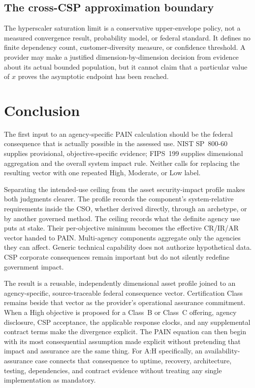 \documentclass[11pt]{article}
\begin{document}
\subsection{The cross-CSP approximation boundary}

The hyperscaler saturation limit is a conservative upper-envelope policy, not a
measured convergence result, probability model, or federal standard. It defines no
finite dependency count, customer-diversity measure, or confidence threshold. A
provider may make a justified dimension-by-dimension decision from evidence about
its actual bounded population, but it cannot claim that a particular value of $x$
proves the asymptotic endpoint has been reached.

\clearpage
\section{Conclusion}

The first input to an agency-specific PAIN calculation should be the federal
consequence that is actually possible in the assessed use. NIST SP~800-60 supplies
provisional, objective-specific evidence; FIPS~199 supplies dimensional aggregation
and the overall system impact rule. Neither calls for replacing the resulting
vector with one repeated High, Moderate, or Low label.

Separating the intended-use ceiling from the asset security-impact profile makes
both judgments clearer. The profile records the component's system-relative
requirements inside the CSO, whether derived directly, through an archetype, or by
another governed method. The ceiling records what the definite agency use puts at
stake. Their per-objective minimum becomes the effective CR/IR/AR vector handed to
PAIN. Multi-agency components aggregate only the agencies they can affect. Generic
technical capability does not authorize hypothetical data. CSP corporate
consequences remain important but do not silently redefine government impact.

The result is a reusable, independently dimensional asset profile joined to an
agency-specific, source-traceable federal consequence vector. Certification Class remains beside
that vector as the provider's operational assurance commitment. When a High
objective is proposed for a Class~B or Class~C offering, agency disclosure, CSP
acceptance, the applicable response clocks, and any supplemental contract terms
make the divergence explicit. The PAIN equation can then begin with its most
consequential assumption made explicit without pretending that impact and
assurance are the same thing. For A:H specifically, an availability-assurance case
connects that consequence to uptime, recovery, architecture, testing, dependencies,
and contract evidence without treating any single implementation as mandatory.
\end{document}
